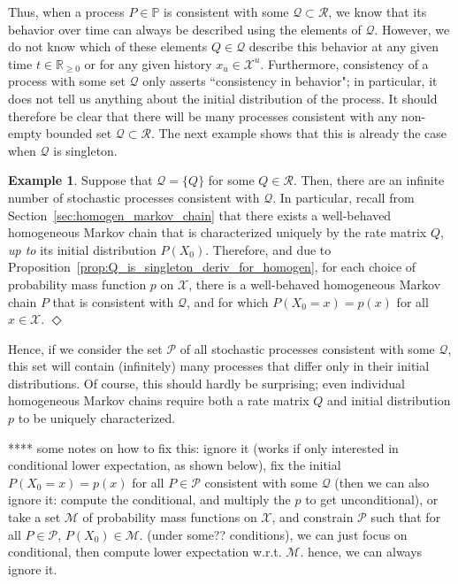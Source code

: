 \documentclass[10pt,a4paper]{paper}
\theoremstyle{definition}
\newtheorem{exmp}{Example}%
\newcommand{\reals}{\mathbb{R}}
\newcommand{\realsnonneg}{\reals_{\geq 0}}
\newcommand{\states}{\mathcal{X}}
\newcommand{\processes}{\mathbb{P}}
\newcommand{\rateset}{\mathcal{Q}}
\newcommand{\exampleend}{\hfill$\Diamond$}
\begin{document}
Thus, when a process $P\in\processes$ is consistent with some $\rateset\subset\mathcal{R}$, we know that its behavior over time can always be described using the elements of $\rateset$. However, we do not know which of these elements $Q\in\rateset$ describe this behavior at any given time  $t\in\realsnonneg$ or for any given history $x_u\in\states^u$. Furthermore, consistency of a process with some set $\rateset$ only asserts ``consistency in behavior"; in particular, it does not tell us anything about the initial distribution of the process. It should therefore be clear that there will be many processes consistent with any non-empty bounded set $\rateset\subset\mathcal{R}$. The next example shows that this is already the case when $\rateset$ is singleton.

\begin{exmp}\label{example:singleton_infinite_consistent}
Suppose that $\rateset=\{Q\}$ for some $Q\in\mathcal{R}$. Then, there are an infinite number of stochastic processes consistent with $\rateset$. In particular, recall from Section~\ref{sec:homogen_markov_chain} that there exists a well-behaved homogeneous Markov chain that is characterized uniquely by the rate matrix $Q$, \emph{up to} its initial distribution $P(X_0)$. Therefore, and due to Proposition~\ref{prop:Q_is_singleton_deriv_for_homogen}, for each choice of probability mass function $p$ on $\states$, there is a well-behaved homogeneous Markov chain $P$ that is consistent with $\rateset$, and for which $P(X_0=x)=p(x)$ for all $x\in\states$.
\exampleend
\end{exmp}

Hence, if we consider the set $\mathcal{P}$ of all stochastic processes consistent with some $\rateset$, this set will contain (infinitely) many processes that differ only in their initial distributions. Of course, this should hardly be surprising; even individual homogeneous Markov chains require both a rate matrix $Q$ and initial distribution $p$ to be uniquely characterized. 

**** some notes on how to fix this: ignore it (works if only interested in conditional lower expectation, as shown below), fix the initial $P(X_0=x)=p(x)$ for all $P\in\mathcal{P}$ consistent with some $\rateset$ (then we can also ignore it: compute the conditional, and multiply the $p$ to get unconditional), or take a set $\mathcal{M}$ of probability mass functions on $\states$, and constrain $\mathcal{P}$ such that for all $P\in\mathcal{P}$, $P(X_0)\in\mathcal{M}$. (under some?? conditions), we can just focus on conditional, then compute lower expectation w.r.t. $\mathcal{M}$. hence, we can always ignore it.
\end{document}
